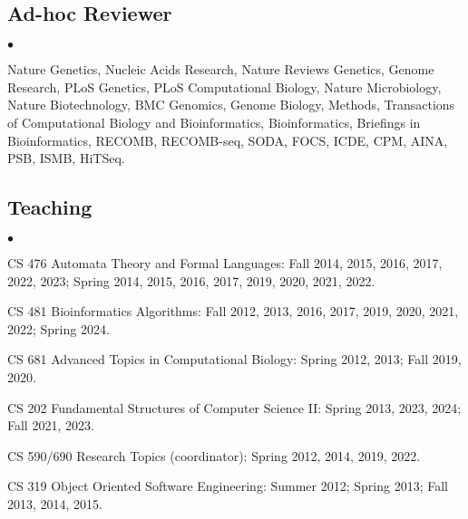 \documentclass[margin,line]{res}
\newenvironment{list2}{
  \begin{list}{$\bullet$}{%
      \setlength{\itemsep}{0.1cm}
      \setlength{\parsep}{0in} \setlength{\parskip}{0in}
      \setlength{\topsep}{0in} \setlength{\partopsep}{0in} 
      \setlength{\leftmargin}{0.2in}}}{\end{list}}
\begin{document}
\begin{resume}
\vspace{-0.4cm}
\subsection{\small \sc Ad-hoc Reviewer}
\begin{list2}
\item
  Nature Genetics, Nucleic Acids Research, Nature Reviews Genetics, Genome Research, PLoS Genetics, PLoS Computational Biology, Nature Microbiology,
  Nature Biotechnology, BMC Genomics, Genome Biology, Methods, Transactions of Computational Biology and Bioinformatics,
  Bioinformatics, Briefings in Bioinformatics, RECOMB, RECOMB-seq, SODA, FOCS, ICDE, CPM, AINA, PSB, ISMB, HiTSeq.
\end{list2}

\vspace{-0.4cm}
\subsection{\small \sc Teaching}
\begin{list2}
  \item CS 476 Automata Theory and Formal Languages: Fall 2014, 2015, 2016, 2017, 2022, 2023; Spring 2014, 2015, 2016, 2017, 2019, 2020, 2021, 2022. 
  \item CS 481 Bioinformatics Algorithms: Fall 2012, 2013, 2016, 2017, 2019, 2020, 2021, 2022; Spring 2024.
  \item CS 681 Advanced Topics in Computational Biology: Spring 2012, 2013; Fall 2019, 2020.
  \item CS 202 Fundamental Structures of Computer Science II: Spring 2013, 2023, 2024; Fall 2021, 2023.
  \item CS 590/690 Research Topics (coordinator): Spring 2012, 2014, 2019, 2022.
  \item CS 319 Object Oriented Software Engineering: Summer 2012; Spring 2013; Fall 2013, 2014, 2015.
\end{list2}


\vspace{-0.4cm}

\end{resume}
\end{document}
